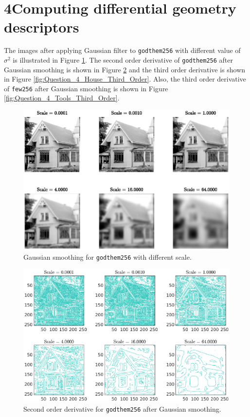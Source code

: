\documentclass[11pt,a4paper]{article}
\begin{document}
\section*{4\hspace{0.5cm}Computing differential geometry descriptors}
	\par The images after applying Gaussian filter to \texttt{godthem256} with different value of $\sigma^{2}$ is illustrated in Figure \ref{fig:Question_4_House_Gaussian}. The second order derivative of \texttt{godthem256} after Gaussian smoothing is shown in Figure \ref{fig:Question_4_House_Second_Order} and the third order derivative is shown in Figure \ref{fig:Question_4_House_Third_Order}. Also, the third order derivative of \texttt{few256} after Gaussian smoothing is shown in Figure \ref{fig:Question_4_Tools_Third_Order}.
	\begin{figure}[!ht]
		\centering
		\includegraphics[width=0.9\columnwidth]{Question_4_House_Gaussian.eps}
		\caption{Gaussian smoothing for \texttt{godthem256} with different scale.}
		\label{fig:Question_4_House_Gaussian}
	\end{figure}
	\begin{figure}[!ht]
		\centering
		\includegraphics[width=0.9\columnwidth]{Question_4_House_Second_Order.eps}
		\caption{Second order derivative for \texttt{godthem256} after Gaussian smoothing.}
		\label{fig:Question_4_House_Second_Order}
	\end{figure}
\end{document}
